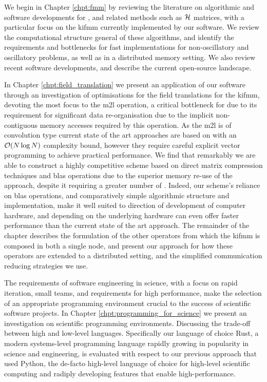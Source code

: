 We begin in Chapter \ref{chpt:fmm} by reviewing the literature on algorithmic and software developments for , and related methods such as $\mathcal{H}$ matrices, with a particular focus on the \acrshort{kifmm} currently implemented by our software. We review the computational structure general of these algorithms, and identify the requirements and bottlenecks for fast implementations for non-oscillatory and oscillatory problems, as well as in a distributed memory setting. We also review recent software developments, and describe the current open-source landscape.

In Chapter \ref{chpt:field_translation} we present an application of our software through an investigation of optimisations for the field translations for the \acrshort{kifmm}, devoting the most focus to the \acrfull{m2l} operation, a critical bottleneck for  due to its requirement for significant data re-organisation due to the implicit non-contiguous memory accesses required by this operation. As the \acrshort{m2l} is of convolution type current state of the art approaches are based on  with an $\mathcal{O}(N \log{N})$ complexity bound, however they require careful explicit vector programming to achieve practical performance. We find that remarkably we are able to construct a highly competitive scheme based on direct matrix compression techniques and \acrfull{blas} operations due to the superior memory re-use of the approach, despite it requiring a greater number of . Indeed, our scheme's reliance on \acrshort{blas} operations, and comparatively simple algorithmic structure and implementation, make it well suited to direction of development of computer hardware, and depending on the underlying hardware can even offer faster performance than the current state of the art approach. The remainder of the chapter describes the formulation of the other operators from which the \acrshort{kifmm} is composed in both a single node, and present our approach for how these operators are extended to a distributed setting, and the simplified communication reducing strategies we use.

The requirements of software engineering in science, with a focus on rapid iteration, small teams, and requirements for high performance, make the selection of an appropriate programming environment crucial to the success of scientific software projects. In Chapter \ref{chpt:programming_for_science} we present an investigation on scientific programming environments. Discussing the trade-off between high and low-level languages. Specifically our language of choice Rust, a modern systems-level programming language rapidly growing in popularity in science and engineering, is evaluated with respect to our previous approach that used Python, the de-facto high-level language of choice for high-level scientific computing and radiply developing features that enable high-performance.

